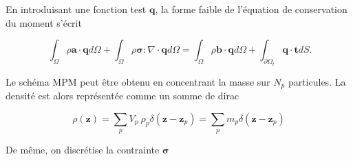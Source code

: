 
En introduisant une fonction test $\bm q$, la forme faible de l'équation de conservation du moment s'écrit

\begin{equation*}~\label{eq:form_faible}
    \int_\Omega \rho \bm a \cdot \bm q d\Omega + \int_\Omega \rho \bm \sigma : \nabla \cdot \bm q d\Omega = \int_\Omega \rho \bm b\cdot \bm q d\Omega + \int_{\partial \Omega_t} \bm q \cdot \bm t dS.
\end{equation*}

Le schéma MPM peut être obtenu en concentrant la masse sur $N_p$ particules. La densité est alors représentée comme un somme de dirac

\begin{equation*}
    \rho(\bm z) = \sum_p V_p~\rho_p \delta(\bm z - \bm z_p) = \sum_p m_p \delta(\bm z - \bm z_p)
\end{equation*}

De même, on discrétise la contrainte $\bm \sigma$

